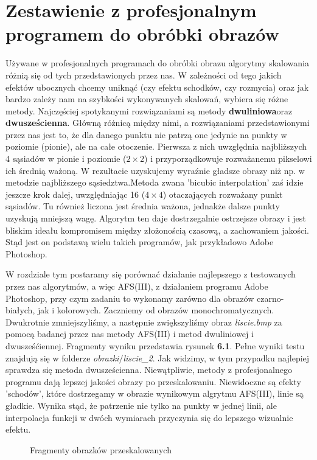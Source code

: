 \section{Zestawienie z profesjonalnym programem do obróbki obrazów}
Używane w profesjonalnych programach do obróbki obrazu algorytmy skalowania
różnią się od tych przedstawionych przez nas. W zależności od tego jakich
efektów ubocznych chcemy uniknąć (czy efektu schodków, czy rozmycia) oraz jak
bardzo zależy nam na szybkości wykonywanych skalowań, wybiera się różne metody.
Najczęściej spotykanymi rozwiązaniami są metody
\textbf{dwuliniowa}oraz \textbf{dwusześcienna}.
Główną różnicą między nimi, a
rozwiązaniami przedstawionymi przez nas jest to, że dla danego punktu nie
patrzą one jedynie na punkty w poziomie (pionie), ale na całe otoczenie.
Pierwsza z nich uwzględnia najbliższych 4 sąsiadów w pionie i poziomie
($2\times2$) i przyporządkowuje rozważanemu pikselowi ich średnią ważoną.
W rezultacie uzyskujemy wyraźnie gładsze obrazy niż np. w metodzie
najbliższego sąsiedztwa.Metoda zwana 'bicubic interpolation' zaś idzie jeszcze krok 
dalej, uwzględniając 16 ($4\times4$) otaczających rozważany punkt sąsiadów. Tu również
liczona jest średnia ważona, jednakże dalsze punkty uzyskują mniejszą wagę.
Algorytm ten daje dostrzegalnie ostrzejsze obrazy i jest bliskim ideału
kompromisem między złożonością czasową, a zachowaniem jakości. Stąd jest on
podstawą wielu takich programów, jak przykładowo Adobe Photoshop.

W rozdziale tym postaramy się porównać działanie najlepszego z testowanych przez
nas algorytmów, a więc AFS(III), z działaniem programu Adobe Photoshop, przy czym zadaniu to
wykonamy zarówno dla obrazów czarno-białych, jak i kolorowych. Zaczniemy od obrazów
monochromatycznych. Dwukrotnie zmniejszyliśmy, a następnie zwiększyliśmy obraz
\textit{liscie.bmp} za pomocą badanej przez nas metody AFS(III) i metod dwuliniowej
i dwusześćiennej. Fragmenty wyniku przedstawia rysunek \textbf{6.1}. Pełne wyniki
testu znajdują się w folderze \textit{obrazki$\slash$liscie\_2}. Jak widzimy, w
tym przypadku najlepiej sprawdza się metoda dwusześcienna. Niewątpliwie, metody z profesjonalnego programu
dają lepszej jakości obrazy po przeskalowaniu. Niewidoczne są efekty 'schodów',
które dostrzegamy w obrazie wynikowym algrytmu AFS(III), linie są gładkie. Wynika stąd, że 
patrzenie nie tylko na punkty w jednej linii, ale interpolacja
funkcji w dwóch wymiarach przyczynia się do lepszego wizualnie efektu.
\begin{figure}[h!tb]
\begin{center}
\caption{Fragmenty obrazków przeskalowanych}
\end{center}
\end{figure}

